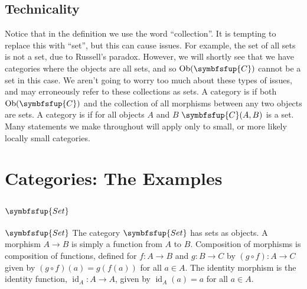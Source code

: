 \documentclass[fleqn]{NotesClass}
\makeatletter
\newcommand{\cat}[1]{\symbfsfup{#1}}
\newcommand{\c@egory}[1]{\symbfsfup{#1}}
\newcommand{\Set}{\c@egory{Set}}
\DeclareMathOperator{\Ob}{Ob}
\DeclareMathOperator{\id}{id}
\makeatother
\begin{document}
    \subsection{Technicality}
    Notice that in the definition we use the word \enquote{collection}.
    It is tempting to replace this with \enquote{set}, but this can cause issues.
    For example, the set of all sets is not a set, due to Russell's paradox.
    However, we will shortly see that we have categories where the objects are all sets, and so \(\Ob(\cat{C})\) cannot be a set in this case.
    We aren't going to worry too much about these types of issues, and may erroneously refer to these collections as sets.
    A category is  if both \(\Ob(\cat{C})\) and the collection of all morphisms between any two objects are sets.
    A category is  if for all objects \(A\) and \(B\) \(\cat{C}(A, B)\) is a set.
    Many statements we make throughout will apply only to small, or more likely locally small categories.
    
    \section{Categories: The Examples}
    \subsection{\texorpdfstring{\(\Set\)}{Set}}
    \begin{dfn}{\normalsize\(\Set\)}{}
        The category \(\Set\)\index{Set@\(\Set\)} has sets as objects.
        A morphism \(A \to B\) is simply a function from \(A\) to \(B\).
        Composition of morphisms is composition of functions, defined for \(f \colon A \to B\) and \(g \colon B \to C\) by \((g \circ f) \colon A \to C\) given by \((g \circ f)(a) = g(f(a))\) for all \(a \in A\).
        The identity morphism is the identity function, \(\id_A \colon A \to A\), given by \(\id_A(a) = a\) for all \(a \in A\).
    \end{dfn}
    
\end{document}
